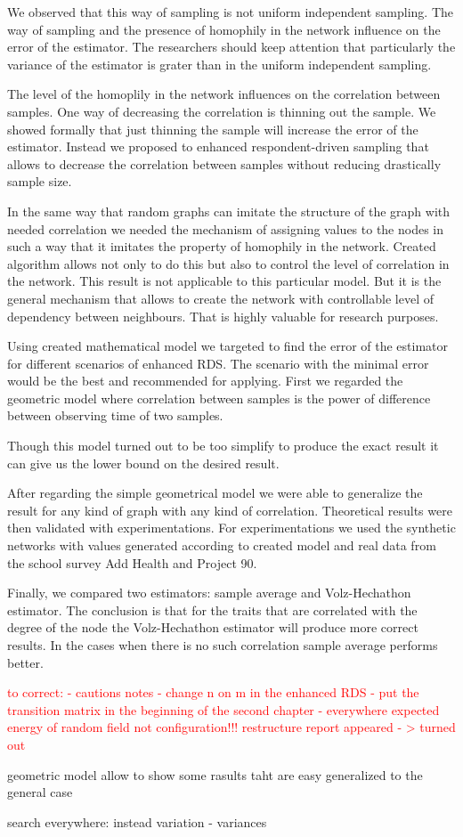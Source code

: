 \documentclass[12pt]{report}
\newcommand\myworries[1]{\textcolor{red}{#1}}
\begin{document}
We observed that this way of sampling is not uniform independent sampling. The way of sampling and the presence of homophily in the network influence on the error of the estimator. The researchers should keep attention that particularly the variance of the estimator is grater than in the uniform independent sampling.

The level of the homoplily in the network influences on the correlation between samples. One way of decreasing the correlation is thinning out the sample. We showed formally that just thinning the sample will increase the error of the estimator. Instead we proposed to enhanced respondent-driven sampling that allows to decrease the correlation between samples without reducing drastically sample size.

In the same way that random graphs can imitate the structure of the graph with needed correlation we needed the mechanism of assigning values to the nodes in such a way that it imitates the property of homophily in the network. Created algorithm allows not only to do this but also to control the level of correlation in the network. This result is not applicable to this particular model. But it is the general mechanism that allows to create the network with controllable level of dependency between neighbours. That is highly valuable for research purposes.

Using created mathematical model we targeted to find the error of the estimator for different scenarios of enhanced RDS. The scenario with the minimal error would be the best and recommended for applying. First we regarded the geometric model where correlation between samples is the power of difference between observing time of two samples.

Though this model turned out to be too simplify to produce the exact result it can give us the lower bound on the desired result.

After regarding the simple geometrical model we were able to generalize the result for any kind of graph with any kind of correlation. Theoretical results were then validated with experimentations. For experimentations we used the synthetic networks with values generated according to created model and real data from the school survey Add Health and Project 90.

Finally, we compared two estimators: sample average and Volz-Hechathon estimator. The conclusion is that for the traits that are correlated with the degree of the node the Volz-Hechathon estimator will produce more correct results. In the cases when there is no such correlation sample average performs better.



\myworries{
to correct:
- cautions notes 
- change n on m in the enhanced RDS
- put the transition matrix in the beginning of the second chapter
- everywhere expected energy of random field not configuration!!!
restructure report
appeared - > turned out
}

geometric model allow to show some rasults taht are easy generalized to the general case

search everywhere: instead variation - variances



\end{document}
